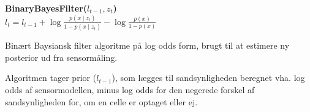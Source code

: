\begin{algorithm}[H]
\textbf{BinaryBayesFilter($l_{t-1}, z_t$)} \\
\Indp $l_t = l_{t-1} + \log \frac{p(x \mid z_t)}{1-p(x \mid z_t)} - \log \frac{p(x)}{1-p(x)}$ \\
\caption{Binært Baysiansk filter algoritme på log odds form, brugt til at estimere ny posterior ud fra sensormåling.}
\label{alg:binaerbayesfilter}
\end{algorithm}

Algoritmen tager prior ($l_{t-1}$), som lægges til sandsynligheden beregnet vha. log odds af sensormodellen, minus log odds for den negerede forskel 
af sandsynligheden for, om en celle er optaget eller ej. \\ \\
\cite[s. 94]{probabilisticRobotics}